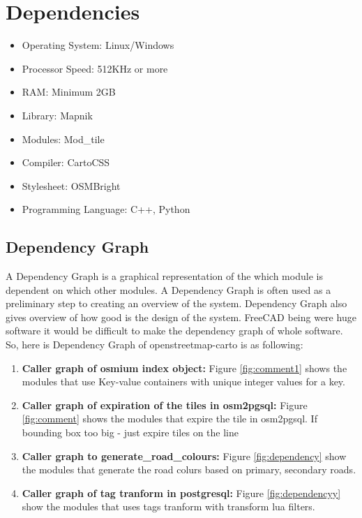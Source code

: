 \section{Dependencies}
\begin{itemize}
	\item Operating System: Linux/Windows
	\item Processor Speed: 512KHz or more
	\item RAM: Minimum 2GB
	\item Library: Mapnik
	\item Modules: Mod\_tile
	\item Compiler: CartoCSS
	\item Stylesheet: OSMBright
	\item Programming Language: C++, Python
\end{itemize}

\subsection{Dependency Graph}
A Dependency Graph is a graphical representation of the which module is dependent on which other modules. A Dependency Graph is often used as a preliminary step to creating an overview of the system. Dependency Graph also gives overview of how good is the design of the system.
FreeCAD being were huge software it would be difficult to make the dependency graph of whole software. So, here is  Dependency Graph of openstreetmap-carto is as following:
\begin{enumerate}
\item \textbf{Caller graph of osmium index object:} Figure \ref{fig:comment1} shows the modules that use Key-value containers with unique integer values for a key.
\item \textbf{Caller graph of expiration of the tiles in osm2pgsql:} Figure \ref{fig:comment} shows the modules that expire the tile in osm2pgsql. If bounding box too big - just expire tiles on the line
\item \textbf{Caller graph to generate\_road\_colours:} Figure \ref{fig:dependency} show the modules that generate the road colurs based on primary, secondary roads.
\item \textbf{Caller graph of tag tranform in postgresql:} Figure \ref{fig:dependencyy} show the modules that uses tags tranform with transform lua filters.
\end{enumerate}

